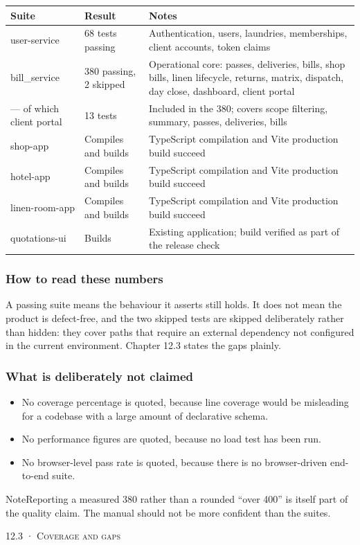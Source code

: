 \documentclass[11pt,a4paper,oneside]{book}
\begin{document}
\begin{center}\small
\begin{tabularx}{\linewidth}{|X|X|X|}
\hline
\rowcolor{lightgrey}
\textbf{Suite} & \textbf{Result} & \textbf{Notes} \\ \hline
user-service & 68 tests passing & Authentication, users, laundries, memberships, client accounts, token claims \\ \hline
bill\_service & 380 passing, 2 skipped & Operational core: passes, deliveries, bills, shop bills, linen lifecycle, returns, matrix, dispatch, day close, dashboard, client portal \\ \hline
— of which client portal & 13 tests & Included in the 380; covers scope filtering, summary, passes, deliveries, bills \\ \hline
shop-app & Compiles and builds & TypeScript compilation and Vite production build succeed \\ \hline
hotel-app & Compiles and builds & TypeScript compilation and Vite production build succeed \\ \hline
linen-room-app & Compiles and builds & TypeScript compilation and Vite production build succeed \\ \hline
quotations-ui & Builds & Existing application; build verified as part of the release check \\ \hline
\end{tabularx}
\end{center}
\subsubsection*{How to read these numbers}
A passing suite means the behaviour it asserts still holds. It does not mean the product is defect-free, and the two skipped tests are skipped deliberately rather than hidden: they cover paths that require an external dependency not configured in the current environment. Chapter 12.3 states the gaps plainly.

\subsubsection*{What is deliberately not claimed}
\begin{itemize}
\item No coverage percentage is quoted, because line coverage would be misleading for a codebase with a large amount of declarative schema.
\item No performance figures are quoted, because no load test has been run.
\item No browser-level pass rate is quoted, because there is no browser-driven end-to-end suite.
\end{itemize}
\begin{notebox}NoteReporting a measured 380 rather than a rounded “over 400” is itself part of the quality claim. The manual should not be more confident than the suites.\end{notebox}
\textsc{\small\color{crimson}12.3 · Coverage and gaps}\par\medskip
\end{document}
